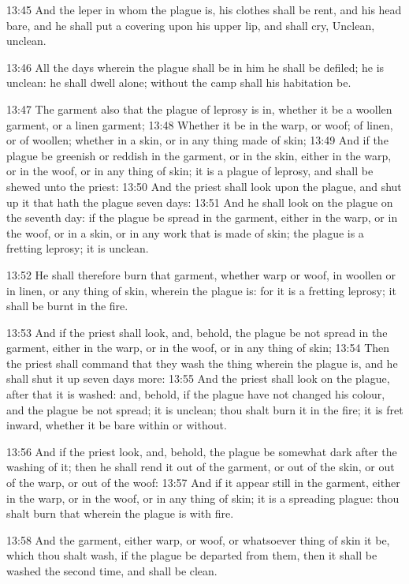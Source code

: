 13:45 And the leper in whom the plague is, his clothes shall be rent, and his head bare, and he shall put a covering upon his upper lip, and shall cry, Unclean, unclean.

13:46 All the days wherein the plague shall be in him he shall be defiled; he is unclean: he shall dwell alone; without the camp shall his habitation be.

13:47 The garment also that the plague of leprosy is in, whether it be a woollen garment, or a linen garment; 13:48 Whether it be in the warp, or woof; of linen, or of woollen; whether in a skin, or in any thing made of skin; 13:49 And if the plague be greenish or reddish in the garment, or in the skin, either in the warp, or in the woof, or in any thing of skin; it is a plague of leprosy, and shall be shewed unto the priest: 13:50 And the priest shall look upon the plague, and shut up it that hath the plague seven days: 13:51 And he shall look on the plague on the seventh day: if the plague be spread in the garment, either in the warp, or in the woof, or in a skin, or in any work that is made of skin; the plague is a fretting leprosy; it is unclean.

13:52 He shall therefore burn that garment, whether warp or woof, in woollen or in linen, or any thing of skin, wherein the plague is: for it is a fretting leprosy; it shall be burnt in the fire.

13:53 And if the priest shall look, and, behold, the plague be not spread in the garment, either in the warp, or in the woof, or in any thing of skin; 13:54 Then the priest shall command that they wash the thing wherein the plague is, and he shall shut it up seven days more: 13:55 And the priest shall look on the plague, after that it is washed: and, behold, if the plague have not changed his colour, and the plague be not spread; it is unclean; thou shalt burn it in the fire; it is fret inward, whether it be bare within or without.

13:56 And if the priest look, and, behold, the plague be somewhat dark after the washing of it; then he shall rend it out of the garment, or out of the skin, or out of the warp, or out of the woof: 13:57 And if it appear still in the garment, either in the warp, or in the woof, or in any thing of skin; it is a spreading plague: thou shalt burn that wherein the plague is with fire.

13:58 And the garment, either warp, or woof, or whatsoever thing of skin it be, which thou shalt wash, if the plague be departed from them, then it shall be washed the second time, and shall be clean.

